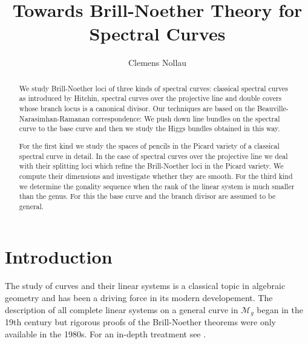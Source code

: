 \documentclass[12pt]{extarticle}
\title{Towards Brill-Noether Theory for Spectral Curves}
\author{Clemens Nollau}
\theoremstyle{definition}
\numberwithin{theorem}{section}
\newcommand{\cM}{\mathcal{M}}
\begin{document}
\maketitle
\begin{abstract}
We study Brill-Noether loci of three kinds of spectral curves: classical spectral curves as introduced by Hitchin, spectral curves over the projective line and double covers whose branch locus is a canonical divisor. Our techniques are based on the Beauville-Narasimhan-Ramanan correspondence: We push down line bundles on the spectral curve to the base curve and then we study the Higgs bundles obtained in this way.

For the first kind we study the spaces of pencils in the Picard variety of a classical spectral curve in detail. In the case of spectral curves over the projective line we deal with their splitting loci which refine the Brill-Noether loci in the Picard variety. We compute their dimensions and investigate whether they are smooth.  For the third kind we determine the gonality sequence when the rank of the linear system is much smaller than the genus. For this the base curve and the branch divisor are assumed to be general.   
\end{abstract}
\section{Introduction}
The study of curves and their linear systems is a classical topic in algebraic geometry and has been a driving force in its modern developement. The description of all complete linear systems on a general curve in $\cM_g$ began in the 19th century but rigorous proofs of the Brill-Noether theorems were only available in the 1980s. For an in-depth treatment see \cite{ACGH}.
\end{document}
